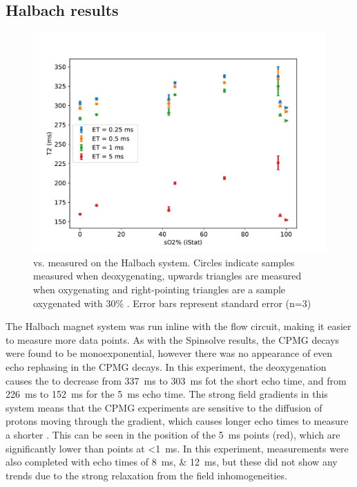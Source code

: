 \subsection{Halbach results}
\begin{figure}[h]
\centering
\includegraphics[width=\textwidth]{figures/stoppedflow/halbachT2SO2.pdf}
\caption[Stopped flow \Ttwo vs. \SOtwo measured on the Halbach system]{\Ttwo vs. \SOtwo measured on the Halbach system. Circles indicate samples measured when deoxygenating, upwards triangles are measured when oxygenating and right-pointing triangles are a sample oxygenated with 30\% \Otwo. Error bars represent standard error (n=3)}
\label{fig:sf-halbachT2SO2}
\end{figure}

The Halbach magnet system was run inline with the flow circuit, making it easier to measure more data points.
As with the Spinsolve results, the CPMG decays were found to be monoexponential, however there was no appearance of even echo rephasing in the CPMG decays.
In this experiment, the deoxygenation causes the \Ttwo to decrease from \SI{337}{ms} to \SI{303}{ms} fot the short echo time, and from \SI{226}{ms} to \SI{152}{ms} for the \SI{5}{ms} echo time.
The strong field gradients in this system means that the CPMG experiments are sensitive to the diffusion of protons moving through the gradient, which causes longer echo times to measure a shorter \Ttwo.
This can be seen in the position of the \SI{5}{ms} points (red), which are significantly lower than points at \textless\SI{1}{ms}.
In this experiment, measurements were also completed with echo times of \SIlist{8;12}{ms}, but these did not show any trends due to the strong relaxation from the field inhomogeneities.

